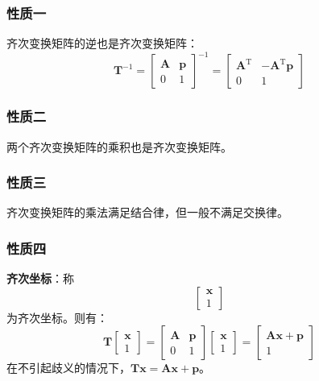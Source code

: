 \subsubsection{性质一}

齐次变换矩阵的逆也是齐次变换矩阵：
\begin{equation}
	\label{eq:性质:逆}
	\boldsymbol{T}^{-1}=\begin{bmatrix}
		\boldsymbol{A} & \boldsymbol{p}\\
		0 & 1
	\end{bmatrix}^{-1}=\begin{bmatrix}
		\boldsymbol{A}^{\mathrm{T}} & -\boldsymbol{A}^{\mathrm{T}}\boldsymbol{p}\\
		0 & 1
	\end{bmatrix}
\end{equation}

\subsubsection{性质二}

两个齐次变换矩阵的乘积也是齐次变换矩阵。

\subsubsection{性质三}

齐次变换矩阵的乘法满足结合律，但一般不满足交换律。

\subsubsection{性质四}

\textbf{齐次坐标}：称
\begin{equation}
	\label{eq:性质:齐次坐标}
	\begin{bmatrix}
		\boldsymbol{x}\\
		1
	\end{bmatrix}
\end{equation}
为齐次坐标。则有：
\begin{equation}
	\label{eq:性质:齐次坐标变换}
	\boldsymbol{T}\begin{bmatrix}
		\boldsymbol{x}\\
		1
	\end{bmatrix}=\begin{bmatrix}
		\boldsymbol{A} & \boldsymbol{p}\\
		0 & 1
	\end{bmatrix}\begin{bmatrix}
		\boldsymbol{x}\\
		1
	\end{bmatrix}=\begin{bmatrix}
		\boldsymbol{A}\boldsymbol{x}+\boldsymbol{p}\\
		1
	\end{bmatrix}
\end{equation}
在不引起歧义的情况下，$\boldsymbol{T}\boldsymbol{x}=\boldsymbol{A}\boldsymbol{x}+\boldsymbol{p}$。

